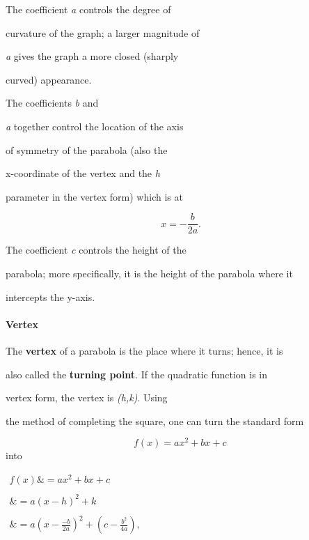 The coefficient \textit{a} controls the degree of

curvature of the graph; a larger magnitude of

\textit{a} gives the graph a more closed (sharply

curved) appearance.



The coefficients \textit{b} and

\textit{a} together control the location of the axis

of symmetry of the parabola (also the

x-coordinate of the vertex and the \textit{h}

parameter in the vertex form) which is at



$$x = -\frac{b}{2a}.$$



The coefficient \textit{c} controls the height of the

parabola; more specifically, it is the height of the parabola where it

intercepts the y-axis.












\paragraph{Vertex}



The \textbf{vertex} of a parabola is the place where it turns; hence, it is

also called the \textbf{turning point}. If the quadratic function is in

vertex form, the vertex is \textit{(h,k)}. Using

the method of completing the square, one can turn the standard form



$$f(x) = a x^2 + b x + c \,$$ into



$\begin{aligned}

f(x) \&= a x^2 + b x + c \\\\\&= a (x - h)^2 + k \\\\\&= a\left(x - \frac{-b}{2a}\right)^2 + \left(c - \frac{b^2}{4a}\right), \\\\    \end{aligned}$



